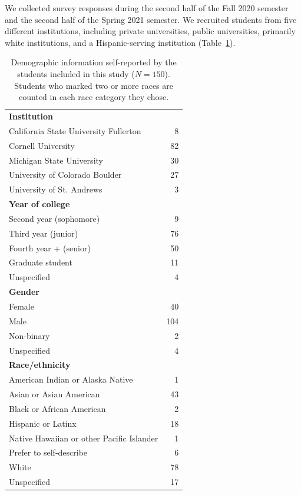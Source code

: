 \documentclass[english,aps,prstper,reprint,showpacs,longbibliography,superscriptaddress,nofootinbib]{revtex4-2}
\begin{document}
We collected survey responses during the second half of the Fall 2020 semester and the second half of the Spring 2021 semester. We recruited students from five different institutions, including private universities, public universities, primarily white institutions, and a Hispanic-serving institution (Table~\ref{ta:demographics}).
\begin{table}[tb] 
  \caption{Demographic information self-reported by the students included in this study ($N=150$). Students who marked two or more races are counted in each race category they chose.}
  \label{ta:demographics}
  \begin{ruledtabular}
    \begin{tabular}{lr}
    \textbf{Institution} & \\
    \quad California State University Fullerton & 8\\
    \quad Cornell University & 82\\
    \quad Michigan State University & 30\\
    \quad University of Colorado Boulder & 27\\
    \quad University of St. Andrews & 3\\
    \textbf{Year of college} \\
    \quad Second year (sophomore) & 9\\
    \quad Third year (junior) & 76\\
    \quad Fourth year + (senior) & 50\\
    \quad Graduate student & 11\\
    \quad Unspecified & 4\\
    \textbf{Gender}\\
    \quad Female & 40\\
    \quad Male & 104\\
    \quad Non-binary & 2\\
    \quad Unspecified & 4\\
    \textbf{Race/ethnicity}\\
    \quad American Indian or Alaska Native & 1\\
    \quad Asian or Asian American & 43 \\
    \quad Black or African American & 2 \\
    \quad Hispanic or Latinx & 18 \\
    \quad Native Hawaiian or other Pacific Islander & 1\\
    \quad Prefer to self-describe & 6\\
    \quad White & 78\\
    \quad Unspecified & 17\\
    \end{tabular}
  \end{ruledtabular}
\end{table}
\end{document}
